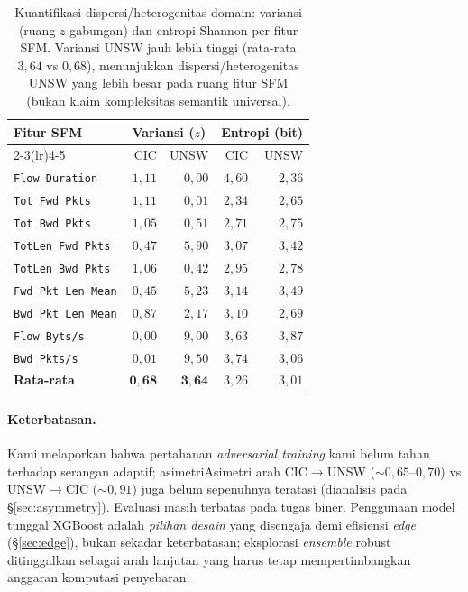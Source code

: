 \documentclass[11pt,a4paper]{article}
\begin{document}
\begin{table}[h]
\centering
\caption{Kuantifikasi dispersi/heterogenitas domain: variansi (ruang $z$ gabungan) dan
entropi Shannon per fitur SFM. Variansi UNSW jauh lebih tinggi (rata-rata
$3{,}64$ vs $0{,}68$), menunjukkan dispersi/heterogenitas UNSW yang lebih besar
pada ruang fitur SFM (bukan klaim kompleksitas semantik universal).}
\label{tab:complexity}
\small
\begin{tabular}{lrrrr}
\toprule
\multirow{2}{*}{Fitur SFM} & \multicolumn{2}{c}{Variansi ($z$)} & \multicolumn{2}{c}{Entropi (bit)} \\
\cmidrule(lr){2-3}\cmidrule(lr){4-5}
 & CIC & UNSW & CIC & UNSW \\
\midrule
\texttt{Flow Duration}    & $1{,}11$ & $0{,}00$ & $4{,}60$ & $2{,}36$ \\
\texttt{Tot Fwd Pkts}     & $1{,}11$ & $0{,}01$ & $2{,}34$ & $2{,}65$ \\
\texttt{Tot Bwd Pkts}     & $1{,}05$ & $0{,}51$ & $2{,}71$ & $2{,}75$ \\
\texttt{TotLen Fwd Pkts}  & $0{,}47$ & $5{,}90$ & $3{,}07$ & $3{,}42$ \\
\texttt{TotLen Bwd Pkts}  & $1{,}06$ & $0{,}42$ & $2{,}95$ & $2{,}78$ \\
\texttt{Fwd Pkt Len Mean} & $0{,}45$ & $5{,}23$ & $3{,}14$ & $3{,}49$ \\
\texttt{Bwd Pkt Len Mean} & $0{,}87$ & $2{,}17$ & $3{,}10$ & $2{,}69$ \\
\texttt{Flow Byts/s}      & $0{,}00$ & $9{,}00$ & $3{,}63$ & $3{,}87$ \\
\texttt{Bwd Pkts/s}       & $0{,}01$ & $9{,}50$ & $3{,}74$ & $3{,}06$ \\
\midrule
\textbf{Rata-rata}        & $\mathbf{0{,}68}$ & $\mathbf{3{,}64}$ & $3{,}26$ & $3{,}01$ \\
\bottomrule
\end{tabular}
\end{table}

\paragraph{Keterbatasan.} \ifadversarial Kami melaporkan bahwa pertahanan
\emph{adversarial training} kami belum tahan terhadap serangan adaptif; asimetri\else Asimetri\fi
arah CIC$\rightarrow$UNSW ($\sim 0{,}65$--$0{,}70$) vs UNSW$\rightarrow$CIC
($\sim 0{,}91$) \ifadversarial juga \fi belum sepenuhnya teratasi (dianalisis pada
\S\ref{sec:asymmetry}). Evaluasi masih terbatas pada tugas biner. Penggunaan
model tunggal XGBoost adalah \emph{pilihan desain} yang disengaja demi efisiensi
\emph{edge} (\S\ref{sec:edge}), bukan sekadar keterbatasan; eksplorasi
\emph{ensemble} robust ditinggalkan sebagai arah lanjutan yang harus tetap
mempertimbangkan anggaran komputasi penyebaran.
\end{document}
